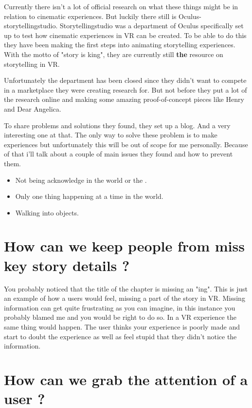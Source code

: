\documentclass{report}
\begin{document}
				Currently there isn't a lot of official research on what these things might be in relation to cinematic experiences. But luckily there still is Oculus-storytellingstudio. Storytellingstudio was a department of Oculus specifically set up to test how cinematic experiences in VR can be created. To be able to do this they have been making the first steps into animating storytelling experiences. With the motto of "story is king", they are currently still \textbf{the} resource on storytelling in VR. 
				
				Unfortunately the department has been closed since they didn't want to compete in a marketplace they were creating research for. But not before they put a lot of the research online and making some amazing proof-of-concept pieces like Henry and Dear Angelica.
				
				
				To share problems and solutions they found, they set up a blog. And a very interesting one at that. The only way to solve these problem is to make experiences but unfortunately this will be out of scope for me personally. Because of that i'll talk about a couple of main issues they found and how to prevent them.
				
				\begin{itemize}
					\item Not being acknowledge in the world or the .
					\item Only one thing happening at a time in the world.
					\item Walking into objects.
				\end{itemize}
				
				
				
				\chapter{How can we keep people from miss key story details ?}
				
				You probably noticed that the title of the chapter is missing an "ing". This is just an example of how a users would feel, missing a part of the story in VR. Missing information can get quite frustrating as you can imagine, in this instance you probably blamed me and you would be right to do so. In a VR experience the same thing would happen. The user thinks your experience is poorly made and start to doubt the experience as well as feel stupid that they didn't notice the information.
				
				\chapter{How can we grab the attention of a user ?}
				
\end{document}
